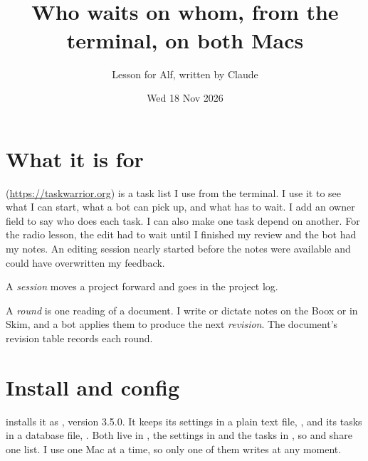 \documentclass[11pt,a4paper]{article}
\title{\emo{clipboard}\ \name{Taskwarrior}\\[0.2em]
  \large Who waits on whom, from the terminal, on both Macs}
\author{Lesson for Alf, written by Claude}
\date{Wed 18 Nov 2026}
\newcommand{\home}{\textasciitilde}  %
\begin{document}
\maketitle

\section*{What it is for}

 (\url{https://taskwarrior.org}) is a task list I use from the terminal. I use it to see what I can start, what a bot can pick up, and what has to wait. I add an owner field to say who does each task. I can also make one task depend on another. For the radio lesson, the edit had to wait until I finished my review and the bot had my notes. An editing session nearly started before the notes were available and could have overwritten my feedback.

A \emph{session} moves a project forward and goes in the project log.

A \emph{round} is one reading of a document. I write or dictate notes on the Boox or in Skim, and a bot applies them to produce the next \emph{revision}. The document's revision table records each round.
\section*{Install and config}

 installs it as , version 3.5.0. It keeps its settings in a plain text file, , and its tasks in a database file, . Both live in \name{\home/Dropbox/Apps/taskwarrior/}, the settings in  and the tasks in , so  and  share one list. I use one Mac at a time, so only one of them writes at any moment.

\end{document}
